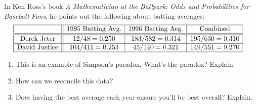 \documentclass[nooutcomes,noauthor,hints,handout,12pt]{ximera}
\begin{document}
\begin{question}
In Ken Ross's book \textit{A Mathematician at the Ballpark: Odds and Probabilities for Baseball Fans}, he points out the following about batting averages:
\[
\begin{array}{|c||c|c|c|} \hline
 & 1995~\text{Batting Avg.} & 1996~\text{Batting Avg.}& \text{Combined}\\ \hline\hline
\text{Derek Jeter} & 12/48 = 0.250 & 183/582 = 0.314 & 195/630 =0.310\\ \hline
\text{David Justice} & 104/411=0.253 & 45/140=0.321  & 149/551 = 0.270\\ \hline
\end{array}
\]
\begin{enumerate}
\item This is an example of Simpson's paradox. What's the paradox? Explain.
\item How can we reconcile this data?
\item Does having the best average each year ensure you'll be best overall? Explain.
\end{enumerate}
\end{question}
\mynewpage
\end{document}
